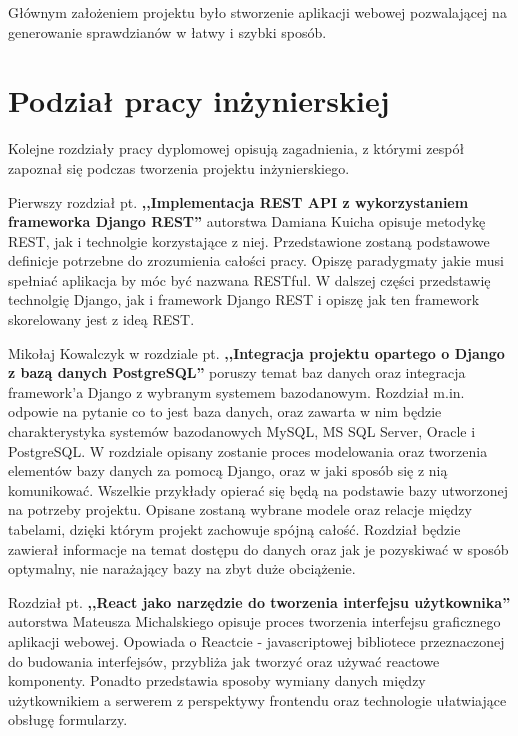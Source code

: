 \documentclass[oneside,polski,logo,indent]{amuthesis}
\begin{document}
Głównym założeniem projektu było stworzenie aplikacji webowej pozwalającej na generowanie sprawdzianów w łatwy i szybki sposób.

\section{Podział pracy inżynierskiej}
Kolejne rozdziały pracy dyplomowej opisują zagadnienia, z którymi zespół zapoznał się podczas tworzenia projektu inżynierskiego.

Pierwszy rozdział pt. \textbf{,,Implementacja REST API z wykorzystaniem frameworka Django REST''} autorstwa Damiana Kuicha opisuje metodykę REST, jak i technolgie korzystające z niej. Przedstawione zostaną podstawowe definicje potrzebne do zrozumienia całości pracy. Opiszę paradygmaty jakie musi spełniać aplikacja by móc być nazwana RESTful. W dalszej części przedstawię technolgię Django, jak i framework Django REST i opiszę jak ten framework skorelowany jest z ideą REST. 

Mikołaj Kowalczyk w rozdziale pt. \textbf{,,Integracja projektu opartego o Django z bazą danych PostgreSQL''} poruszy temat baz danych oraz integracja framework’a Django z wybranym systemem bazodanowym. Rozdział m.in. odpowie na pytanie co to jest baza danych, oraz zawarta w nim będzie charakterystyka systemów bazodanowych MySQL, MS SQL Server, Oracle i PostgreSQL. W rozdziale opisany zostanie proces modelowania oraz tworzenia elementów bazy danych za pomocą Django, oraz w jaki sposób się z nią komunikować. Wszelkie przykłady opierać się będą na podstawie bazy utworzonej na potrzeby projektu. Opisane zostaną wybrane modele oraz relacje między tabelami, dzięki którym projekt zachowuje spójną całość. Rozdział będzie zawierał informacje na temat dostępu do danych oraz jak je pozyskiwać w sposób optymalny, nie narażający bazy na zbyt duże obciążenie.
 
Rozdział pt. \textbf{,,React jako narzędzie do tworzenia interfejsu użytkownika''} autorstwa Mateusza Michalskiego opisuje proces tworzenia interfejsu graficznego aplikacji webowej. Opowiada o Reactcie - javascriptowej bibliotece przeznaczonej do budowania interfejsów, przybliża jak tworzyć oraz używać reactowe komponenty. Ponadto przedstawia sposoby wymiany danych między użytkownikiem a serwerem z perspektywy frontendu oraz technologie ułatwiające obsługę formularzy.
\end{document}
